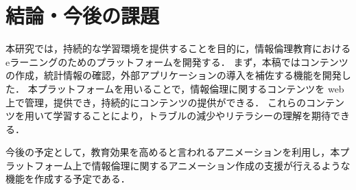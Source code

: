 \section{結論・今後の課題}\label{sec5}
本研究では，持続的な学習環境を提供することを目的に，情報倫理教育におけるeラーニングのためのプラットフォームを開発する．
まず，本稿ではコンテンツの作成，統計情報の確認，外部アプリケーションの導入を補佐する機能を開発した．
本プラットフォームを用いることで，情報倫理に関するコンテンツを web 上で管理，提供でき，持続的にコンテンツの提供ができる．
これらのコンテンツを用いて学習することにより，トラブルの減少やリテラシーの理解を期待できる．

今後の予定として，教育効果を高めると言われるアニメーションを利用し\cite{elsec}，本プラットフォーム上で情報倫理に関するアニメーション作成の支援が行えるような機能を作成する予定である．
